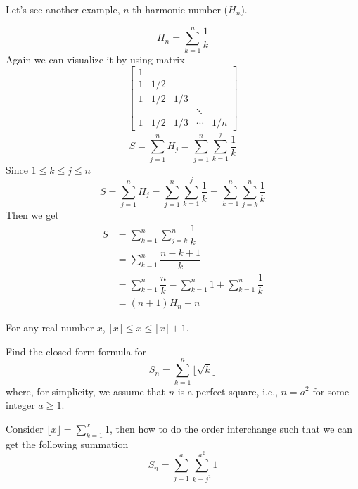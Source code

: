 Let's see another example, \(n\)-th harmonic number (\(H_n\)).

\begin{eg}
	\[
		H_n = \sum_{k = 1}^n \dfrac{1}{k}
	\]
	Again we can visualize it by using matrix
	\[
		\begin{bmatrix}
			1 &  &  &  &   \\
			1 & 1/2 &  &  &   \\
			1 & 1/2 & 1/3 &  &   \\
			  &  &  & \ddots &   \\
			1 & 1/2 & 1/3 & \cdots &1/n
		\end{bmatrix}
	\]
	\[
		S = \sum_{j = 1}^n H_j = \sum_{j = 1}^n  \sum_{k = 1}^j \dfrac{1}{k} 
	\]
	Since \(1 \leq k \leq j \leq n\) 
	\[
		S = \sum_{j = 1}^n H_j = \sum_{j = 1}^n  \sum_{k = 1}^j \dfrac{1}{k} = \sum_{k = 1}^n  \sum_{j = k}^n \dfrac{1}{k}
	\]
	Then we get
	\[
		\begin{aligned}
			S &= \sum_{k = 1}^n  \sum_{j = k}^n \dfrac{1}{k} \\
			&= \sum_{k = 1}^n \dfrac{n - k + 1}{k} \\
			&= \sum_{k = 1}^n \dfrac{n}{k} - \sum_{k = 1}^n 1 + \sum_{k = 1}^n \dfrac{1}{k} \\
			&= (n+1)H_n - n
		\end{aligned}
	\]
\end{eg}

\begin{exercise}
	For any real number \(x\), \(\lfloor x \rfloor \leq  x \leq  \lfloor x \rfloor + 1\).

	Find the closed form formula for 
	\[
		S_n = \sum_{k = 1}^n \lfloor\sqrt{k}\rfloor
	\]
	where, for simplicity, we assume that \(n\) is a perfect square, i.e., \(n = a^2\) for some integer \(a \geq 1\). 
	\begin{remark}
		Consider \(\lfloor x \rfloor = \sum_{k = 1}^x 1\), then how to do the order interchange such that we can get the following summation 
		\[
			S_n = \sum_{j = 1}^a \sum_{k = j^2}^{a^2} 1
		\]
	\end{remark}
\end{exercise}

